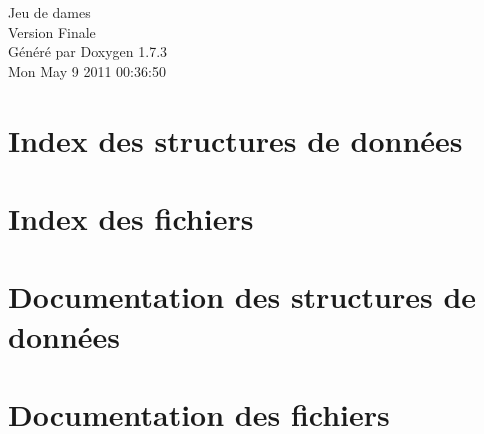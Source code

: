 \documentclass[a4paper]{book}
\begin{document}
\hypersetup{pageanchor=false}
\begin{titlepage}
\vspace*{7cm}
\begin{center}
{\Large Jeu de dames \\[1ex]\large Version Finale }\\
\vspace*{1cm}
{\large Généré par Doxygen 1.7.3}\\
\vspace*{0.5cm}
{\small Mon May 9 2011 00:36:50}\\
\end{center}
\end{titlepage}
\clearemptydoublepage
{}
\tableofcontents
\clearemptydoublepage
{}
\hypersetup{pageanchor=true}
\chapter{Index des structures de données}

\chapter{Index des fichiers}

\chapter{Documentation des structures de données}










\chapter{Documentation des fichiers}
















\printindex
\end{document}

